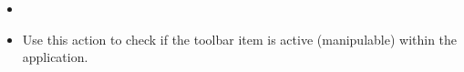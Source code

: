 
\begin{itemize}
\item \item Use this action to check if the toolbar item is active (manipulable) within the application.
\end{itemize}
